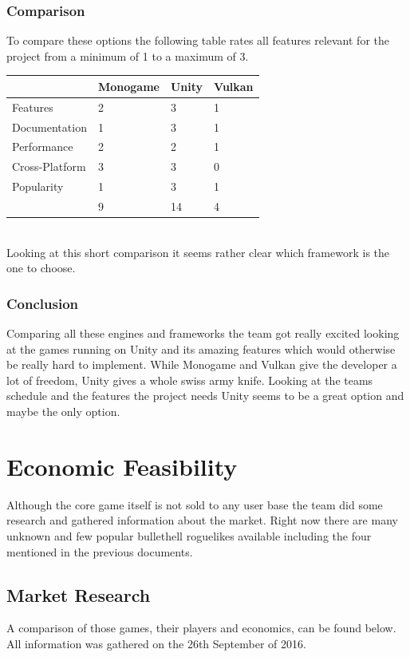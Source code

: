 \documentclass[11pt]{article}
\begin{document}
\subsubsection{Comparison}
To compare these options the following table rates all features relevant for the project from a minimum of 1 to a maximum of 3.
\bigskip
\\
\begin{tabular}{l|l|l|l}
 & Monogame & Unity & Vulkan\\
 \hline
 Features 	& 2 & 3 & 1\\
 Documentation 	& 1 & 3 & 1\\
 Performance 	& 2 & 2 & 1\\
 Cross-Platform & 3 & 3 & 0\\
 Popularity 	& 1 & 3 & 1\\
 \hline
 & 9 & 14 & 4
\end{tabular}
\bigskip
\\
Looking at this short comparison it seems rather clear which framework is the one to choose.

\subsubsection{Conclusion}
Comparing all these engines and frameworks the team got really excited looking at the games running on Unity and its amazing features which would otherwise be really hard to implement. 
While Monogame and Vulkan give the developer a lot of freedom, Unity gives a whole swiss army knife. Looking at the teams schedule and the features the project needs Unity seems to be a great option and maybe the only option.

\newpage

\section{Economic Feasibility}
Although the core game itself is not sold to any user base the team did some research and gathered information about the market.
Right now there are many unknown and few popular bullethell roguelikes available including the four mentioned in the previous documents.

\subsection{Market Research}
A comparison of those games, their players and economics, can be found below. All information was gathered on the 26th September of 2016.
\end{document}
